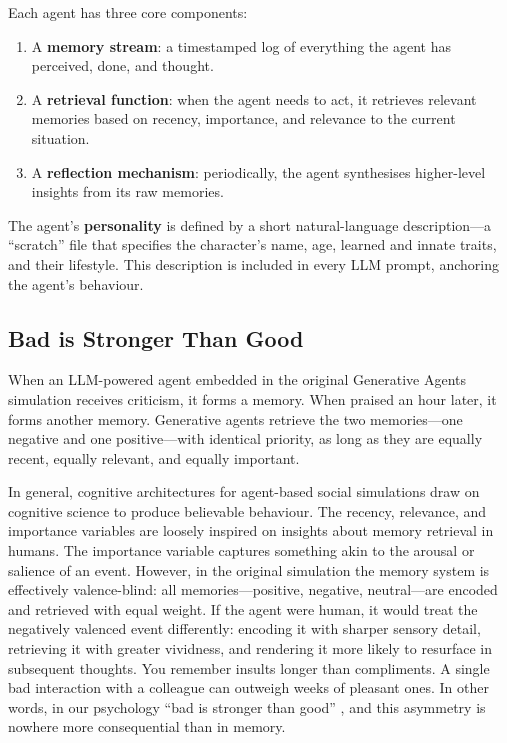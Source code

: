 Each agent has three core components:
\begin{enumerate}
    \item A \textbf{memory stream}: a timestamped log of everything the agent has perceived, done, and thought.
    \item A \textbf{retrieval function}: when the agent needs to act, it retrieves relevant memories based on recency, importance, and relevance to the current situation.
    \item A \textbf{reflection mechanism}: periodically, the agent synthesises higher-level insights from its raw memories.
\end{enumerate}

The agent's \textbf{personality} is defined by a short natural-language description---a ``scratch'' file that specifies the character's name, age, learned and innate traits, and their lifestyle. This description is included in every LLM prompt, anchoring the agent's behaviour. 

\subsection{Bad is Stronger Than Good}

When an LLM-powered agent embedded in the original Generative Agents simulation receives criticism, it forms a memory. When praised an hour later, it forms another memory. Generative agents retrieve the two memories---one negative and one positive---with identical priority, as long as they are equally recent, equally relevant, and equally important. 

In general, cognitive architectures for agent-based social simulations draw on cognitive science to produce believable behaviour. The recency, relevance, and importance variables are loosely inspired on insights about memory retrieval in humans. The importance variable captures something akin to the arousal or salience of an event. However, in the original simulation \citep{park2022social} the memory system is effectively valence-blind: all memories---positive, negative, neutral---are encoded and retrieved with equal weight. If the agent were human, it would treat the negatively valenced event differently: encoding it with sharper sensory detail, retrieving it with greater vividness, and rendering it more likely to resurface in subsequent thoughts. You remember insults longer than compliments. A single bad interaction with a colleague can outweigh weeks of pleasant ones. In other words, in our psychology ``bad is stronger than good'' \citep{baumeister2001bad}, and this asymmetry is nowhere more consequential than in memory.

